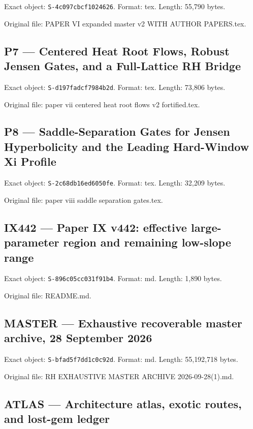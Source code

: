 \documentclass[
  10pt,
  a4paper,
  10pt,
  oneside,
  openany]{book}
\begin{document}
Exact object: \texttt{S-4c097cbcf1024626}. Format: tex. Length: 55,790
bytes.

Original file: PAPER VI expanded master v2 WITH AUTHOR PAPERS.tex.

\subsection{P7 --- Centered Heat Root Flows, Robust Jensen Gates, and a
Full-Lattice RH Bridge}\label{source-p7}

Exact object: \texttt{S-d197fadcf7984b2d}. Format: tex. Length: 73,806
bytes.

Original file: paper vii centered heat root flows v2 fortified.tex.

\subsection{P8 --- Saddle-Separation Gates for Jensen Hyperbolicity and
the Leading Hard-Window Xi Profile}\label{source-p8}

Exact object: \texttt{S-2c68db16ed6050fe}. Format: tex. Length: 32,209
bytes.

Original file: paper viii saddle separation gates.tex.

\subsection{IX442 --- Paper IX v442: effective large-parameter region
and remaining low-slope range}\label{source-ix442}

Exact object: \texttt{S-896c05cc031f91b4}. Format: md. Length: 1,890
bytes.

Original file: README.md.

\subsection{MASTER --- Exhaustive recoverable master archive, 28
September 2026}\label{source-master}

Exact object: \texttt{S-bfad5f7dd1c0c92d}. Format: md. Length:
55,192,718 bytes.

Original file: RH EXHAUSTIVE MASTER ARCHIVE 2026-09-28(1).md.

\subsection{ATLAS --- Architecture atlas, exotic routes, and lost-gem
ledger}\label{source-atlas}
\end{document}
